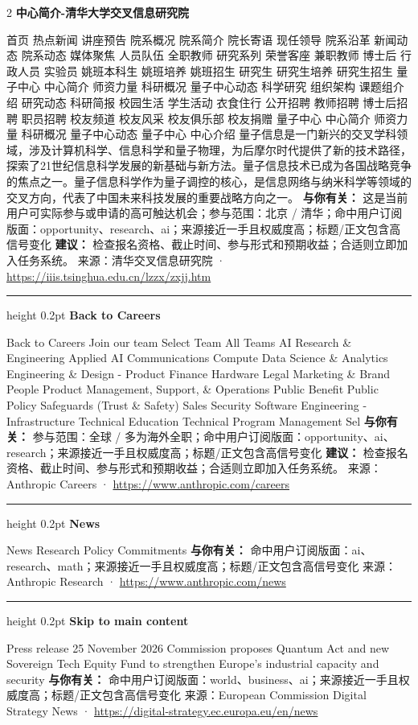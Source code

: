 \documentclass[10.5pt]{ctexart}
\begin{document}
\begin{multicols}{2}
{\large\bfseries 中心简介-清华大学交叉信息研究院}\par
首页 热点新闻 讲座预告 院系概况 院系简介 院长寄语 现任领导 院系沿革 新闻动态 院系动态 媒体聚焦 人员队伍 全职教师 研究系列 荣誉客座 兼职教师 博士后 行政人员 实验员 姚班本科生 姚班培养 姚班招生 研究生 研究生培养 研究生招生 量子中心 中心简介 师资力量 科研概况 量子中心动态 科学研究 组织架构 课题组介绍 研究动态 科研简报 校园生活 学生活动 衣食住行 公开招聘 教师招聘 博士后招聘 职员招聘 校友频道 校友风采 校友俱乐部 校友捐赠 量子中心 中心简介 师资力量 科研概况 量子中心动态 量子中心 中心介绍 量子信息是一门新兴的交叉学科领域，涉及计算机科学、信息科学和量子物理，为后摩尔时代提供了新的技术路径，探索了21世纪信息科学发展的新基础与新方法。量子信息技术已成为各国战略竞争的焦点之一。量子信息科学作为量子调控的核心，是信息网络与纳米科学等领域的交叉方向，代表了中国未来科技发展的重要战略方向之一。
\textbf{与你有关：} 这是当前用户可实际参与或申请的高可触达机会；参与范围：北京 / 清华；命中用户订阅版面：opportunity、research、ai；来源接近一手且权威度高；标题/正文包含高信号变化
\textbf{建议：} 检查报名资格、截止时间、参与形式和预期收益；合适则立即加入任务系统。
{\footnotesize\color{ormuted} 来源：清华交叉信息研究院 · \url{https://iiis.tsinghua.edu.cn/lzzx/zxjj.htm}}
\vspace{2mm}
\hrule height 0.2pt
\vspace{2mm}
{\large\bfseries Back to Careers}\par
Back to Careers Join our team Select Team All Teams AI Research \& Engineering Applied AI Communications Compute Data Science \& Analytics Engineering \& Design - Product Finance Hardware Legal Marketing \& Brand People Product Management, Support, \& Operations Public Benefit Public Policy Safeguards (Trust \& Safety) Sales Security Software Engineering - Infrastructure Technical Education Technical Program Management Sel
\textbf{与你有关：} 参与范围：全球 / 多为海外全职；命中用户订阅版面：opportunity、ai、research；来源接近一手且权威度高；标题/正文包含高信号变化
\textbf{建议：} 检查报名资格、截止时间、参与形式和预期收益；合适则立即加入任务系统。
{\footnotesize\color{ormuted} 来源：Anthropic Careers · \url{https://www.anthropic.com/careers}}
\vspace{2mm}
\hrule height 0.2pt
\vspace{2mm}
{\large\bfseries News}\par
News Research Policy Commitments
\textbf{与你有关：} 命中用户订阅版面：ai、research、math；来源接近一手且权威度高；标题/正文包含高信号变化
{\footnotesize\color{ormuted} 来源：Anthropic Research · \url{https://www.anthropic.com/news}}
\vspace{2mm}
\hrule height 0.2pt
\vspace{2mm}
{\large\bfseries Skip to main content}\par
Press release 25 November 2026 Commission proposes Quantum Act and new Sovereign Tech Equity Fund to strengthen Europe's industrial capacity and security
\textbf{与你有关：} 命中用户订阅版面：world、business、ai；来源接近一手且权威度高；标题/正文包含高信号变化
{\footnotesize\color{ormuted} 来源：European Commission Digital Strategy News · \url{https://digital-strategy.ec.europa.eu/en/news}}
\end{multicols}
\end{document}
